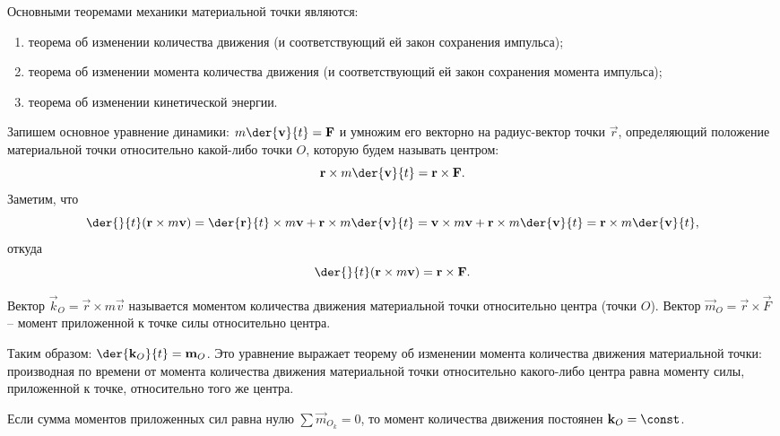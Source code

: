 
Основными теоремами механики материальной точки являются:
\begin{enumerate}
    \item теорема об изменении количества движения (и соответствующий ей закон
    сохранения импульса);
    \item теорема об изменении момента количества движения (и соответствующий ей
    закон сохранения момента импульса);
    \item теорема об изменении кинетической энергии.
\end{enumerate}


Запишем основное уравнение динамики: \( \ds m\der{\vec{v}}{t} = \vec{F} \) и
умножим его векторно на радиус-вектор точки \( \vec{r} \), определяющий положение
материальной точки относительно какой-либо точки \( O \), которую будем называть
центром:
\[
    \vec{r}\times m\der{\vec{v}}{t} = \vec{r}\times\vec{F}.
\]
Заметим, что
\[
    \der{}{t}(\vec{r}\times m\vec{v}) = \der{\vec{r}}{t}\times m\vec{v} +
    \vec{r}\times m\der{\vec{v}}{t} = \vec{v}\times m\vec{v} +
    \vec{r}\times m\der{\vec{v}}{t} = \vec{r}\times m\der{\vec{v}}{t},
\]
откуда
\[
    \der{}{t}(\vec{r}\times m\vec{v}) = \vec{r}\times\vec{F}.
\]

Вектор \( \vec{k}_O = \vec{r}\times m\vec{v} \) называется моментом количества
движения материальной точки относительно центра (точки \( O \)). Вектор
\( \vec{m}_O = \vec{r}\times\vec{F} \) -- момент приложенной к точке силы
относительно центра.

Таким образом: \( \ds \der{\vec{k}_O}{t} = \vec{m}_O \). Это уравнение выражает
теорему об изменении момента количества движения материальной точки: производная
по времени от момента количества движения материальной точки относительно
какого-либо центра равна моменту силы, приложенной к точке, относительно того же
центра.


Если сумма моментов приложенных сил равна нулю \( \sum\vec{m}_{O_k} = 0 \),
то момент количества движения постоянен \( \vec{k}_O = \const \).

\newpage %

